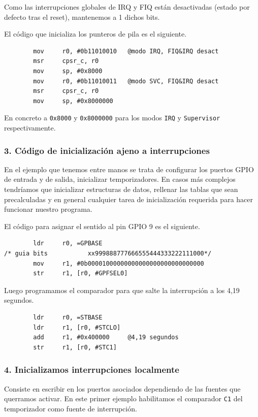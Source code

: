 Como las interrupciones globales de IRQ y FIQ están desactivadas (estado por defecto tras
el reset), mantenemos a 1 dichos bits.

El código que inicializa los punteros de pila es el siguiente.

\begin{lstlisting}
        mov     r0, #0b11010010   @modo IRQ, FIQ&IRQ desact
        msr     cpsr_c, r0
        mov     sp, #0x8000
        mov     r0, #0b11010011   @modo SVC, FIQ&IRQ desact
        msr     cpsr_c, r0
        mov     sp, #0x8000000
\end{lstlisting}

En concreto a {\tt 0x8000} y {\tt 0x8000000} para los modos {\tt IRQ} y
{\tt Supervisor} respectivamente.

\subsubsection{3. Código de inicialización ajeno a interrupciones}

En el ejemplo que tenemos entre manos se trata de configurar los puertos
GPIO de entrada y de salida, inicializar temporizadores. En casos más complejos tendríamos que
inicializar estructuras de datos, rellenar las tablas que sean precalculadas y en general
cualquier tarea de inicialización requerida para hacer funcionar nuestro programa.

El código para asignar el sentido al pin GPIO 9 es el siguiente.

\begin{lstlisting}
        ldr     r0, =GPBASE
/* guia bits           xx999888777666555444333222111000*/
        mov     r1, #0b00001000000000000000000000000000
        str     r1, [r0, #GPFSEL0]
\end{lstlisting}

Luego programamos el comparador para que salte la interrupción a los 4,19 segundos.

\begin{lstlisting}
        ldr     r0, =STBASE
        ldr     r1, [r0, #STCLO]
        add     r1, #0x400000     @4,19 segundos
        str     r1, [r0, #STC1]
\end{lstlisting}

\subsubsection{4. Inicializamos interrupciones localmente}

Consiste en escribir en los puertos asociados dependiendo de las fuentes que querramos
activar. En este primer ejemplo habilitamos el comparador
{\tt C1} del temporizador como fuente de interrupción.

